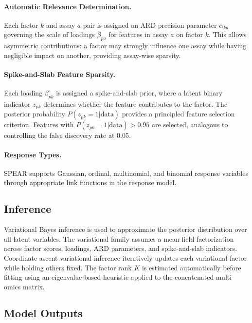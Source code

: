 \documentclass[11pt]{article}
\begin{document}
\paragraph{Automatic Relevance Determination.} Each factor $k$ and assay $a$ pair is assigned an ARD precision parameter $\alpha_{ka}$ governing the scale of loadings $\beta_{pa}$ for features in assay $a$ on factor $k$. This allows asymmetric contributions: a factor may strongly influence one assay while having negligible impact on another, providing assay-wise sparsity.

\paragraph{Spike-and-Slab Feature Sparsity.} Each loading $\beta_{pk}$ is assigned a spike-and-slab prior, where a latent binary indicator $z_{pk}$ determines whether the feature contributes to the factor. The posterior probability $P(z_{pk} = 1 | \text{data})$ provides a principled feature selection criterion. Features with $P(z_{pk} = 1 | \text{data}) > 0.95$ are selected, analogous to controlling the false discovery rate at 0.05.

\paragraph{Response Types.} SPEAR supports Gaussian, ordinal, multinomial, and binomial response variables through appropriate link functions in the response model.

\subsection{Inference}

Variational Bayes inference \citep{blei2017variational} is used to approximate the posterior distribution over all latent variables. The variational family assumes a mean-field factorization across factor scores, loadings, ARD parameters, and spike-and-slab indicators. Coordinate ascent variational inference iteratively updates each variational factor while holding others fixed. The factor rank $K$ is estimated automatically before fitting using an eigenvalue-based heuristic applied to the concatenated multi-omics matrix.

\subsection{Model Outputs}
\end{document}
